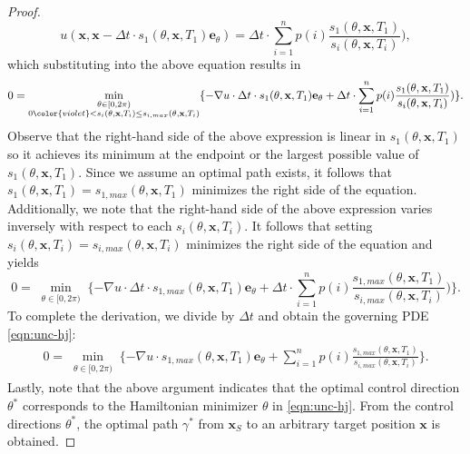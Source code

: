 \documentclass[pdflatex,sn-mathphys-num]{sn-jnl}%
\def \bx{{\mathbf {x}}}
\def \be{{\mathbf {e}}}
\theoremstyle{thmstyleone}%
\theoremstyle{thmstyletwo}%
\theoremstyle{thmstylethree}%
\begin{document}
\begin{proof}
    \begin{equation}
        u(\bx,\bx-\Delta t \cdot s_1(\theta,\bx,T_1)\be_\theta) = \Delta t \cdot \sum_{i=1}^{n} p(i) \frac{s_1 (\theta, \bx, T_1)}{s_i (\theta, \bx, T_i)}),
    \end{equation}
    which substituting into the above equation results in 
    \begin{equation}
        0 = \min\limits_{\substack{\theta \in [0,2\pi) \\ 0 {\color{violet} <}  s_i(\theta,\bx,T_i) \leq s_{i,max}(\theta, \bx,T_i) }} \{ - \nabla u \cdot \Delta t \cdot s_1(\theta,\bx,T_1)\be_\theta + \Delta t \cdot \sum_{i=1}^{n} p(i) \frac{s_1 (\theta, \bx, T_1)}{s_i (\theta, \bx, T_i)})\}.
    \end{equation}
    Observe that the right-hand side of the above expression is linear in $s_1(\theta,\bx,T_1)$ so it achieves its minimum at the endpoint or the largest possible value of $s_1(\theta,\bx,T_1)$.  Since we assume an optimal path exists, it follows that $s_1(\theta,\bx,T_1)=s_{1,max}(\theta,\bx,T_1)$ minimizes the right side of the equation.  Additionally, we note that the right-hand side of the above expression varies inversely with respect to each $s_i(\theta,\bx,T_i)$.  It follows that setting $s_i(\theta,\bx,T_i)=s_{i,max}(\theta,\bx,T_i)$ minimizes the right side of the equation and yields
    \begin{equation}
        0 = \min\limits_{\substack{\theta \in [0,2\pi) }} \{ - \nabla u \cdot \Delta t \cdot s_{1,max}(\theta,\bx,T_1)\be_\theta + \Delta t \cdot \sum_{i=1}^{n} p(i) \frac{s_{1,max} (\theta, \bx, T_1)}{s_{i,max} (\theta, \bx, T_i)})\}.
    \end{equation}
To complete the derivation, we divide by $\Delta t$ and obtain the governing PDE
 \eqref{eqn:unc-hj}:
    \begin{align}
        0 = \min\limits_{\substack{\theta \in [0,2\pi)}} \{ - \nabla u  \cdot s_{1,max}(\theta,\bx,T_1)\be_\theta + \sum_{i=1}^{n} p(i) \frac{s_{1,max} (\theta, \bx, T_1)}{s_{i,max} (\theta, \bx, T_i)}\}.
    \end{align}
Lastly, note that the above argument indicates that the optimal control direction $\theta^*$ corresponds to the Hamiltonian minimizer $\theta$ in \eqref{eqn:unc-hj}.  From the control directions $\theta^*$, the optimal path $\gamma^*$ from $\bx_S$ to an arbitrary target position $\bx$ is obtained.


\end{proof}
\end{document}
